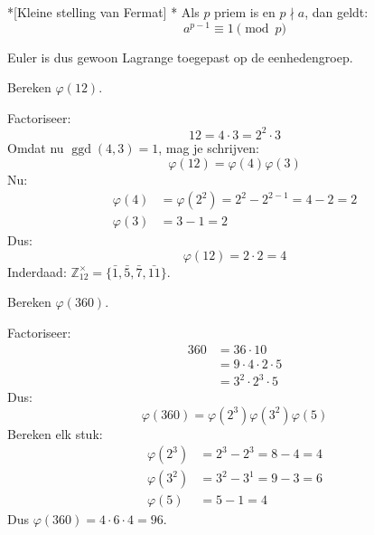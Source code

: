 \begin{nicecorollary}*[Kleine stelling van Fermat]
    \nextpart[]*
    Als $p$ priem is en $p \nmid a$, dan geldt:
    \begin{equation*}
        a^{p-1} \equiv 1 \pmod p
    \end{equation*}
\end{nicecorollary}

Euler is dus gewoon Lagrange toegepast op de eenhedengroep.

\newpage
\textbf{} Bereken $\varphi(12)$.

 Factoriseer:
\begin{equation*}
    12 = 4 \cdot 3 = 2^2 \cdot 3
\end{equation*}
Omdat nu $\operatorname{ggd}(4,3)=1$, mag je schrijven:
\begin{equation*}
    \varphi(12) = \varphi(4)\varphi(3)
\end{equation*}
Nu:
\begin{equation*}
    \begin{aligned}
        \varphi(4) &= \varphi(2^2) = 2^2 - 2^{2-1} = 4 - 2 = 2 \\
        \varphi(3) &= 3 - 1 = 2
    \end{aligned}
\end{equation*}
Dus:
\begin{equation*}
    \varphi(12)=2 \cdot 2 = 4
\end{equation*}
Inderdaad: $\mathbb{Z}_{12}^{\times} = \{\bar{1},\bar{5},\bar{7},\bar{11}\}$.

\textbf{} Bereken $\varphi(360)$.

 Factoriseer:
\begin{equation*}
    \begin{aligned}
        360 &= 36 \cdot 10 \\ 
            &= 9 \cdot 4 \cdot 2 \cdot 5 \\
            &= 3^2 \cdot 2^3 \cdot 5 
    \end{aligned}
\end{equation*}
Dus:
\begin{equation*}
    \varphi(360) = \varphi(2^3)\varphi(3^2)\varphi(5)
\end{equation*}
Bereken elk stuk:
\begin{equation*}
    \begin{aligned}
        \varphi(2^3) &= 2^3 - 2^3 = 8 - 4 = 4 \\
        \varphi(3^2) &= 3^2 - 3^1 = 9 - 3 = 6 \\
        \varphi(5)   &= 5 - 1 = 4
    \end{aligned}
\end{equation*}
Dus $\varphi(360) = 4 \cdot 6 \cdot 4 = 96$.

